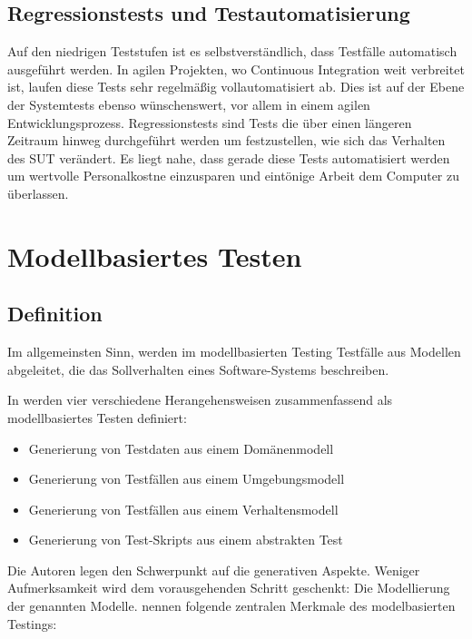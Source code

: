 \subsection{Regressionstests und Testautomatisierung}
\label{sec:regressionstests}
Auf den niedrigen Teststufen ist es selbstverständlich, dass Testfälle automatisch ausgeführt werden. In agilen Projekten, wo Continuous Integration weit verbreitet ist, laufen diese Tests sehr regelmäßig vollautomatisiert ab. Dies ist auf der Ebene der Systemtests ebenso wünschenswert, vor allem in einem agilen Entwicklungsprozess\cite{linz_testing_2014}. Regressionstests sind Tests die über einen längeren Zeitraum hinweg durchgeführt werden um festzustellen, wie sich das Verhalten des \Gls{SUT} verändert. Es liegt nahe, dass gerade diese Tests automatisiert werden um wertvolle Personalkostne einzusparen und eintönige Arbeit dem Computer zu überlassen.




\section{Modellbasiertes Testen}
\label{sec:mbt}
\subsection{Definition}
Im allgemeinsten Sinn, werden im modellbasierten Testing Testfälle aus Modellen abgeleitet, die das Sollverhalten eines Software-Systems beschreiben.

In \cite{utting_practical_2007} werden vier verschiedene Herangehensweisen zusammenfassend als modellbasiertes Testen definiert:

\begin{itemize}
\item Generierung von Testdaten aus einem Domänenmodell
\item Generierung von Testfällen aus einem Umgebungsmodell
\item Generierung von Testfällen aus einem Verhaltensmodell
\item Generierung von Test-Skripts aus einem abstrakten Test
\end{itemize}

Die Autoren legen den Schwerpunkt auf die generativen Aspekte. Weniger Aufmerksamkeit wird dem vorausgehenden Schritt geschenkt: Die Modellierung der genannten Modelle. \citeauthor{rossner_basiswissen_2010}\cite{rossner_basiswissen_2010} nennen folgende zentralen Merkmale des modelbasierten Testings:

